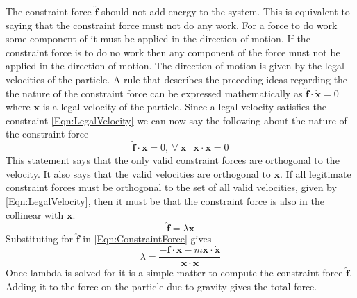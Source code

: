 The constraint force $\hat{\mathbf{f}}$ should not add energy to the system.
This is equivalent to saying that the constraint force must not do any work. For
a force to do work some component of it must be applied in the direction of
motion. If the constraint force is to do no work then any component of the force
must not be applied in the direction of motion. The direction of motion is given
by the legal velocities of the particle. A rule that describes the preceding ideas
regarding the the nature of the constraint force can be expressed mathematically
as $\hat{\mathbf{f}}\cdot\mathbf{\dot{x}}=0$ where
$\mathbf{\dot{x}}$ is a legal velocity of the particle. Since a legal velocity
satisfies the constraint \ref{Eqn:LegalVelocity} we can now say the following about
the nature of the constraint force
\begin{equation}
    \hat{\mathbf{f}}\cdot\dot{\mathbf{x}} = 0, \ \forall \ \dot{\mathbf{x}} \
    \vert \ \dot{\mathbf{x}}\cdot\mathbf{x}  = 0
\end{equation}
This statement says that the only valid constraint forces are orthogonal to the
velocity. It also says that the valid velocities are orthogonal to $\mathbf{x}$.
If all legitimate constraint forces must be orthogonal to the set of all valid
velocities, given by \ref{Eqn:LegalVelocity}, then it must be that the constraint
force is also in the collinear with $\mathbf{x}$.  
\begin{equation}
    \hat{\mathbf{f}}=\lambda\mathbf{x}
    \label{cforcesimple}
\end{equation} 
Substituting for $\mathbf{\hat{f}}$ in \ref{Eqn:ConstraintForce} gives
\begin{equation}    
    \lambda = \frac{-\mathbf{f}\cdot\mathbf{x} -
    m\mathbf{\dot{x}}\cdot\dot{\mathbf{x}}}{\mathbf{x}\cdot\mathbf{\dot{x}}}
    \label{Eqn:LambdaSimple}
\end{equation}
Once lambda is solved for it is a simple matter to compute the constraint force
$\mathbf{\hat{f}}$. Adding it to the force on the particle due to gravity gives
the total force.

